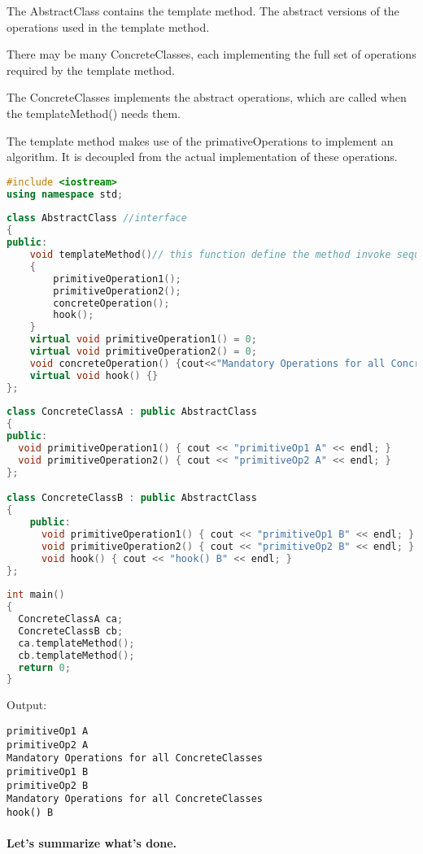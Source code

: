 \documentclass{book}
\begin{document}
    The AbstractClass contains the template method. The abstract versions of the operations used in the template method.

    There may be many ConcreteClasses, each implementing the full set of operations required by the template method.

    The ConcreteClasses implements the abstract operations, which are called when the templateMethod() needs them.

    The template method makes use of the primativeOperations to implement an algorithm. It is decoupled from the actual implementation of these operations.


\begin{lstlisting}[caption={Template Method Pattern Sample 1}, language=C++]
#include <iostream>
using namespace std;
 
class AbstractClass //interface
{
public:
	void templateMethod()// this function define the method invoke sequence
    {
		primitiveOperation1();
		primitiveOperation2();
		concreteOperation();
		hook();
	}
	virtual void primitiveOperation1() = 0;
	virtual void primitiveOperation2() = 0;
	void concreteOperation() {cout<<"Mandatory Operations for all ConcreteClasses"<<endl;}
	virtual void hook() {}
};
 
class ConcreteClassA : public AbstractClass 
{
public:
  void primitiveOperation1() { cout << "primitiveOp1 A" << endl; }
  void primitiveOperation2() { cout << "primitiveOp2 A" << endl; }
};

class ConcreteClassB : public AbstractClass 
{
    public:
      void primitiveOperation1() { cout << "primitiveOp1 B" << endl; }
      void primitiveOperation2() { cout << "primitiveOp2 B" << endl; }
      void hook() { cout << "hook() B" << endl; }
};
 
int main()
{
  ConcreteClassA ca;
  ConcreteClassB cb;
  ca.templateMethod();
  cb.templateMethod();
  return 0;
}
\end{lstlisting}

Output:
\begin{verbatim}
primitiveOp1 A
primitiveOp2 A
Mandatory Operations for all ConcreteClasses
primitiveOp1 B
primitiveOp2 B
Mandatory Operations for all ConcreteClasses
hook() B
\end{verbatim}


\paragraph{Let's summarize what's done.}
\end{document}
